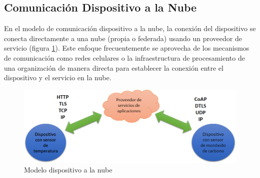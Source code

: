 \subsection{Comunicación Dispositivo a la Nube}
En el modelo de comunicación dispositivo a la nube, la conexión del dispositivo se conecta directamente a una nube (propia o federada) usando un proveedor de servicio (figura \ref{fig:d2n}). Este enfoque frecuentemente se aprovecha de los mecanismos de comunicación como redes celulares o la infraestructura de procesamiento de una  organización de manera directa para establecer la conexión entre el dispositivo y el servicio en la nube.
\begin{figure}[htb]
\centering
\includegraphics[scale=0.4]{./Figuras/d2n.png}
\caption{Modelo dispositivo a la nube}
\label{fig:d2n}
\vspace*{-10pt}
\end{figure}

